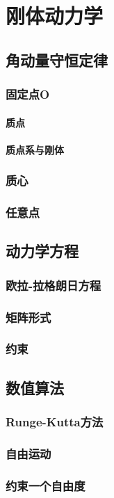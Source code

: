 \chapter{刚体动力学}
\section{角动量守恒定律}
\subsection{固定点O}
\subsubsection{质点}
\subsubsection{质点系与刚体}
\subsection{质心}
\subsection{任意点}
\section{动力学方程}
\subsection{欧拉-拉格朗日方程}
\subsection{矩阵形式}
\subsection{约束}
\section{数值算法}
\subsection{Runge-Kutta方法}
\subsection{自由运动}
\subsection{约束一个自由度}
